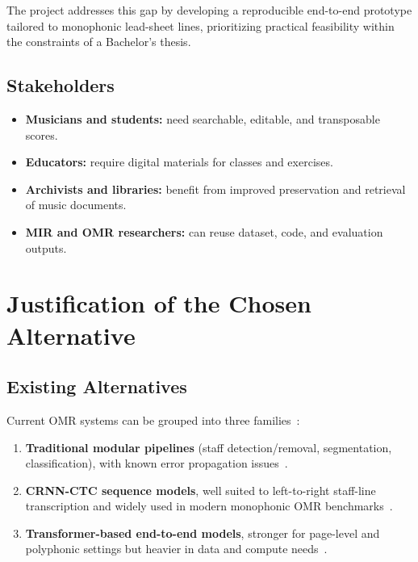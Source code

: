 \documentclass[11pt, a4paper]{article}
\begin{document}
The project addresses this gap by developing a reproducible end-to-end prototype tailored to monophonic lead-sheet lines, prioritizing practical feasibility within the constraints of a Bachelor's thesis.

\subsection{Stakeholders}
\begin{itemize}
    \item \textbf{Musicians and students:} need searchable, editable, and transposable scores.
    \item \textbf{Educators:} require digital materials for classes and exercises.
    \item \textbf{Archivists and libraries:} benefit from improved preservation and retrieval of music documents.
    \item \textbf{MIR and OMR researchers:} can reuse dataset, code, and evaluation outputs.
\end{itemize}

\section{Justification of the Chosen Alternative}
\label{sec:justification}

\subsection{Existing Alternatives}
Current OMR systems can be grouped into three families~\cite{shatriOPTICALMUSICRECOGNITION}:
\begin{enumerate}
    \item \textbf{Traditional modular pipelines} (staff detection/removal, segmentation, classification), with known error propagation issues~\cite{dalitzComparativeStudyStaff2008}.
    \item \textbf{CRNN-CTC sequence models}, well suited to left-to-right staff-line transcription and widely used in modern monophonic OMR benchmarks~\cite{PrIMuSDataset,simonettaOpticalMusicRecognition2024}.
    \item \textbf{Transformer-based end-to-end models}, stronger for page-level and polyphonic settings but heavier in data and compute needs~\cite{vilaAntoniorv6SMT2026,UfalOlimpicicdar24Practical,simonettaOpticalMusicRecognition2024}.
\end{enumerate}
\end{document}
